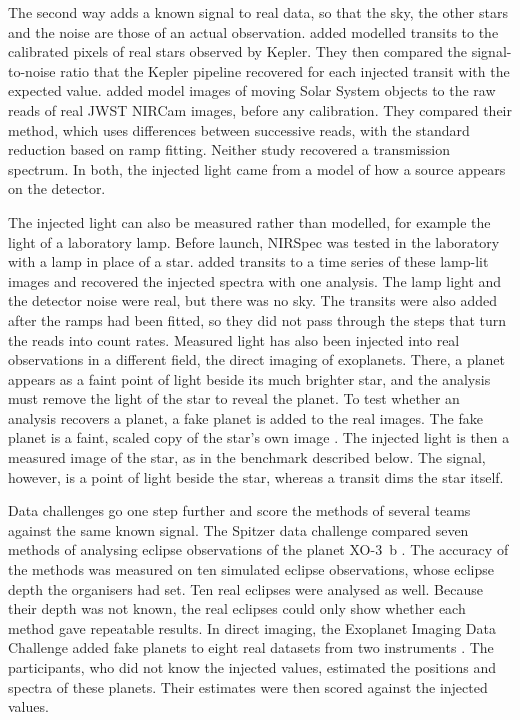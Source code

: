 The second way adds a known signal to real data, so that the sky, the other
stars and the noise are those of an actual observation.
\citet{ChristiansenEtAl2013} added modelled transits to the calibrated pixels
of real stars observed by Kepler. They then compared the signal-to-noise ratio
that the Kepler pipeline recovered for each injected transit with the expected
value. \citet{GirmeniaMetchev2026} added model images of moving Solar System
objects to the raw reads of real JWST NIRCam images, before any calibration.
They compared their method, which uses differences between successive reads, with the standard reduction based on ramp fitting. Neither study recovered a transmission spectrum. In both, the injected
light came from a model of how a source appears on the detector.

The injected light can also be measured rather than modelled, for example the
light of a laboratory lamp. Before launch, NIRSpec was tested in the
laboratory with a lamp in place of a star. \citet{RustamkulovEtAl2022} added
transits to a time series of these lamp-lit images and recovered the injected
spectra with one analysis. The lamp light and the detector noise were real,
but there was no sky. The transits were also added after the ramps had been
fitted, so they did not pass through the steps that turn the reads into count
rates. Measured light has also been injected into real observations in a
different field, the direct imaging of exoplanets. There, a planet appears as
a faint point of light beside its much brighter star, and the analysis must
remove the light of the star to reveal the planet. To test whether an
analysis recovers a planet, a fake planet is added to the real images. The
fake planet is a faint, scaled copy of the star's own image
\citep{LafreniereEtAl2007}. The injected light is then a measured image of the
star, as in the benchmark described below. The signal, however, is a point of
light beside the star, whereas a transit dims the star itself.

Data challenges go one step further and score the methods of several teams
against the same known signal. The Spitzer data challenge compared seven
methods of analysing eclipse observations of the planet XO-3~b
\citep{IngallsEtAl2016}. The accuracy of the methods was measured on ten
simulated eclipse observations, whose eclipse depth the organisers had set.
Ten real eclipses were analysed as well. Because their depth was not known,
the real eclipses could only show whether each method gave repeatable
results. In direct imaging, the Exoplanet Imaging Data Challenge added fake
planets to eight real datasets from two instruments
\citep{CantalloubeEtAl2024}. The participants, who did not know the injected
values, estimated the positions and spectra of these planets. Their estimates
were then scored against the injected values.

